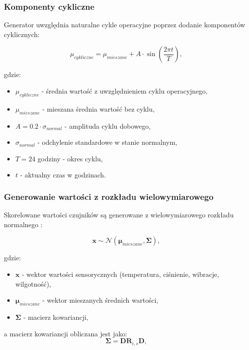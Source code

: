 \subsubsection{Komponenty cykliczne}

Generator uwzględnia naturalne cykle operacyjne poprzez dodanie komponentów cyklicznych:

\begin{equation}
\mu_{cykliczne} = \mu_{mieszane} + A \cdot \sin\left(\frac{2\pi t}{T}\right),
\end{equation}

gdzie:
\begin{itemize}
    \item $\mu_{cykliczne}$ - średnia wartość z uwzględnieniem cyklu operacyjnego,
    \item $\mu_{mieszane}$ - mieszana średnia wartość bez cyklu,
    \item $A = 0.2 \cdot \sigma_{normal}$ - amplituda cyklu dobowego,
    \item $\sigma_{normal}$ - odchylenie standardowe w stanie normalnym,
    \item $T = 24$ godziny - okres cyklu,
    \item $t$ - aktualny czas w godzinach.
\end{itemize}

\newpage

\subsubsection{Generowanie wartości z rozkładu wielowymiarowego}

Skorelowane wartości czujników są generowane z wielowymiarowego rozkładu normalnego \cite{anderson_mva}:

\begin{equation}
\mathbf{x} \sim \mathcal{N}(\boldsymbol{\mu}_{mieszane}, \boldsymbol{\Sigma}),
\end{equation}

gdzie:
\begin{itemize}
    \item $\mathbf{x}$ - wektor wartości sensorycznych (temperatura, ciśnienie, wibracje, wilgotność),
    \item $\boldsymbol{\mu}_{mieszane}$ - wektor mieszanych średnich wartości,
    \item $\boldsymbol{\Sigma}$ - macierz kowariancji,
\end{itemize}

a macierz kowariancji obliczana jest jako:
\begin{equation}
\boldsymbol{\Sigma} = \mathbf{D} \mathbf{R}_{i,s} \mathbf{D},
\end{equation}

